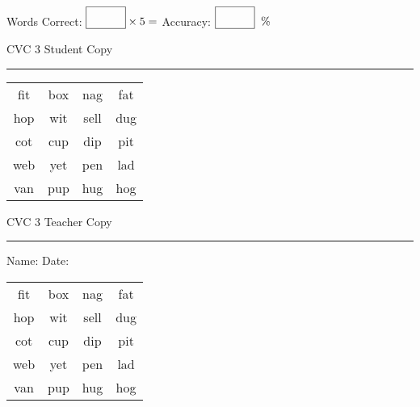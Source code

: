 \documentclass{memoir}
\begin{document}
\small

Words Correct: $\fbox{\phantom{\huge 100}} \times 5 = $ Accuracy: $\fbox{\phantom{\huge 100}}\;\; \%$ 

\vfill

\newpage


\footnotesize \noindent
CVC 3 \hfill Student Copy
\smallskip
\hrule

\Large

\setlength{\tabcolsep}{14pt}
\def\arraystretch{2}

{\selectfont


\begin{vplace}[0.5]
\begin{center}
\begin{tabular}{cccc}
fit & box & nag & fat \\
hop & wit & sell & dug \\
cot & cup & dip & pit \\
web & yet & pen & lad \\
van & pup & hug & hog \\
\end{tabular}
\end{center}
\end{vplace}

}

\newpage

\footnotesize \noindent
CVC 3 \hfill Teacher Copy
\smallskip
\hrule

\small

\vfill

\noindent
Name: \underline{\hspace{1.75in}} \hfill Date: \underline{\hspace{1in}}

\Large

{\selectfont


\begin{vplace}[0.5]
\begin{center}
\begin{tabular}{cccc}
fit & box & nag & fat \\
hop & wit & sell & dug \\
cot & cup & dip & pit \\
web & yet & pen & lad \\
van & pup & hug & hog \\
\end{tabular}
\end{center}
\end{vplace}



}
\end{document}
